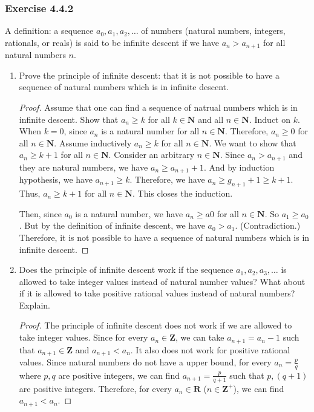 \documentclass[12pt, letter]{article}
\begin{document}
\subsubsection*{Exercise 4.4.2}
A definition: a sequence $a_0,a_1,a_2,\dotsc$ of numbers (natural numbers, integers, rationals, or reals) is said to be infinite descent if we have $a_n>a_{n+1}$ for all
natural numbers $n$.
\begin{enumerate}[label=(\alph*)]
    \item Prove the principle of infinite descent: that it is not possible to have a sequence of natural numbers which is in infinite descent.
    \begin{proof}
        Assume that one can find a sequence of natrual numbers which is in infinite descent. Show that $a_n\geq k$ for all $k\in\mathbf{N}$ and all $n\in\mathbf{N}$. Induct on $k$. When $k=0$, since $a_n$ is a natural 
        number for all $n\in\mathbf{N}$. Therefore, $a_n\geq 0$ for all $n\in\mathbf{N}$. Assume inductively $a_n\geq k$ for all $n\in\mathbf{N}$. We want to show that $a_n\geq k+1$ for all $n\in\mathbf{N}$.
        Consider an arbitrary $n\in\mathbf{N}$. Since $a_n>a_{n+1}$ and they are natural numbers, we have $a_n\geq a_{n+1}+1$. And by induction hypothesis, we have $a_{n+1}\geq k$. Therefore, we have $a_n\geq g_{n+1}+1\geq k+1$. 
        Thus, $a_n\geq k+1$ for all $n\in\mathbf{N}$. This closes the induction. 
        
        Then, since $a_0$ is a natural number, we have $a_n\geq a0$ for all $n\in\mathbf{N}$. So $a_1\geq a_0$. But by the definition of infinite descent, we have $a_0>a_1$. (Contradiction.)
        Therefore, it is not possible to have a sequence of natural numbers which is in infinite descent.
    \end{proof}
    \item Does the principle of infinite descent work if the sequence $a_1,a_2,a_3,\dotsc$ is allowed to take integer values instead of natural number values? What about if it is allowed 
    to take positive rational values instead of natural numbers? Explain.
    \begin{proof}
        The principle of infinite descent does not work if we are allowed to take integer values. Since for every $a_n\in \mathbf{Z}$, we can take $a_{n+1}=a_n-1$ such that $a_{n+1}\in\mathbf{Z}$ and $a_{n+1}<a_n$. 
        It also does not work for positive rational values. Since natural numbers do not have a upper bound, for every $a_n=\frac{p}{q}$ where $p,q$ are positive integers, we can find $a_{n+1}=\frac{p}{q+1}$ such that 
        $p,(q+1)$ are positive integers. Therefore, for every $a_n\in\mathbf{R}$ ($n\in \mathbf{Z}^+$), we can find $a_{n+1}<a_n$. 
    \end{proof}
\end{enumerate}
\end{document}
